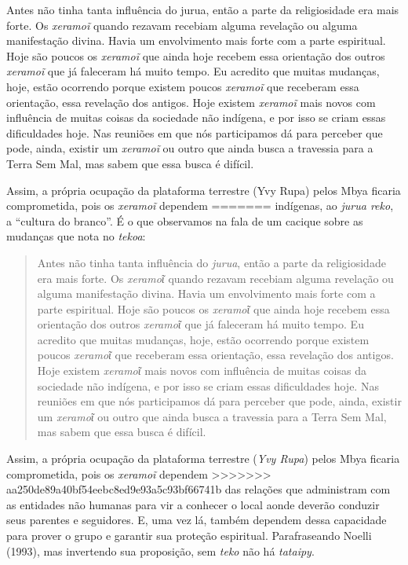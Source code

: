 Antes não tinha tanta influência do jurua, então a parte da
religiosidade era mais forte. Os \emph{xeramoĩ} quando
rezavam recebiam alguma revelação ou alguma manifestação divina. Havia
um envolvimento mais forte com a parte espiritual. Hoje são poucos os
\emph{xeramoĩ} que ainda hoje recebem essa orientação
dos outros \emph{xeramoĩ} que já faleceram há muito
tempo. Eu acredito que muitas mudanças, hoje, estão ocorrendo porque
existem poucos \emph{xeramoĩ} que receberam essa
orientação, essa revelação dos antigos. Hoje existem
\emph{xeramoĩ} mais novos com influência de muitas
coisas da sociedade não indígena, e por isso se criam essas
dificuldades hoje. Nas reuniões em que nós participamos dá para perceber
que pode, ainda, existir um \emph{xeramoĩ} ou outro que
ainda busca a travessia para a Terra Sem Mal, mas sabem que essa busca
é difícil. 

Assim, a própria ocupação da plataforma terrestre (Yvy Rupa) pelos Mbya
ficaria comprometida, pois os \emph{xeramoĩ} dependem
=======
indígenas, ao \emph{jurua reko}, a ``cultura do branco''. É o que observamos na
fala de um cacique sobre as mudanças que nota no \emph{tekoa}:

\begin{quote}
Antes não tinha tanta influência do \emph{jurua}, então a parte da
religiosidade era mais forte. Os \emph{xeramoῖ} quando rezavam recebiam
alguma revelação ou alguma manifestação divina. Havia um envolvimento
mais forte com a parte espiritual. Hoje são poucos os \emph{xeramoῖ} que
ainda hoje recebem essa orientação dos outros \emph{xeramoῖ} que já
faleceram há muito tempo. Eu acredito que muitas mudanças, hoje, estão
ocorrendo porque existem poucos \emph{xeramoῖ} que receberam essa
orientação, essa revelação dos antigos. Hoje existem \emph{xeramoῖ} mais
novos com influência de muitas coisas da sociedade não indígena, e por
isso se criam essas dificuldades hoje. Nas reuniões em que nós participamos
dá para perceber que pode, ainda, existir um \emph{xeramoῖ} ou outro que
ainda busca a travessia para a Terra Sem Mal, mas sabem que essa busca é
difícil.
\end{quote}

Assim, a própria ocupação da plataforma terrestre (\emph{Yvy Rupa}) pelos Mbya
ficaria comprometida, pois os \emph{xeramo\~{i}} dependem
>>>>>>> aa250de89a40bf54eebc8ed9e93a5c93bf66741b
das relações que administram com as entidades não humanas para vir a
conhecer o local aonde deverão conduzir seus parentes e seguidores. E,
uma vez lá, também dependem dessa capacidade para prover o grupo e
garantir sua proteção espiritual. Parafraseando Noelli (1993), mas
invertendo sua proposição, sem \emph{teko} não há \emph{tataipy}.

